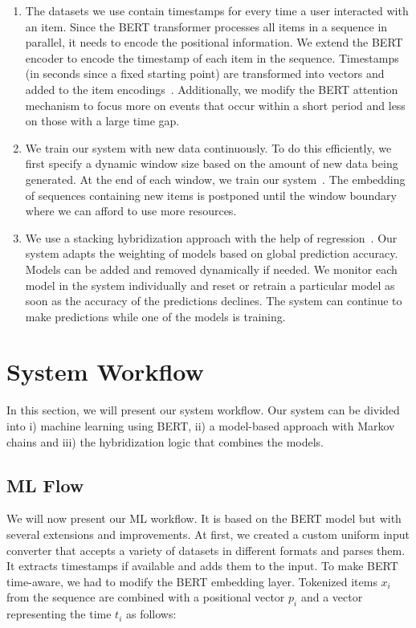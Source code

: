 \begin{enumerate}
    \item The datasets we use contain timestamps for every time a user interacted with an item. Since the BERT transformer processes all items in a sequence in parallel, it needs to encode the positional information. We extend the BERT encoder to encode the timestamp of each item in the sequence. Timestamps (in seconds since a fixed starting point) are transformed into vectors and added to the item encodings~\cite{mou2019t}. Additionally, we modify the BERT attention mechanism to focus more on events that occur within a short period and less on those with a large time gap.  
    
    
    \item We train our system with new data continuously. To do this efficiently, we first specify a dynamic window size based on the amount of new data being generated. At the end of each window, we train our system~\cite{misra1982finding,fan2000summary}. The embedding of sequences containing new items is postponed until the window boundary where we can afford to use more resources.
    
    \item We use a stacking hybridization approach with the help of regression~\cite{lee2021sunrise}. Our system adapts the weighting of models based on global prediction accuracy. Models can be added and removed dynamically if needed. We monitor each model in the system individually and reset or retrain a particular model as soon as the accuracy of the predictions declines. The system can continue to make predictions while one of the models is training.
\end{enumerate}


\section{System Workflow}
In this section, we will present our system workflow. Our system can be divided into i) machine learning using BERT, ii) a model-based approach with Markov chains and iii) the hybridization logic that combines the models. 

\subsection{ML Flow}
We will now present our ML workflow. It is based on the BERT model but with several extensions and improvements. At first, we created a custom uniform input converter that accepts a variety of datasets in different formats and parses them. It extracts timestamps if available and adds them to the input. To make BERT time-aware, we had to modify the BERT embedding layer. Tokenized items $x_i$ from the sequence are combined with a positional vector $p_i$ and a vector representing the time $t_i$ as follows: 

